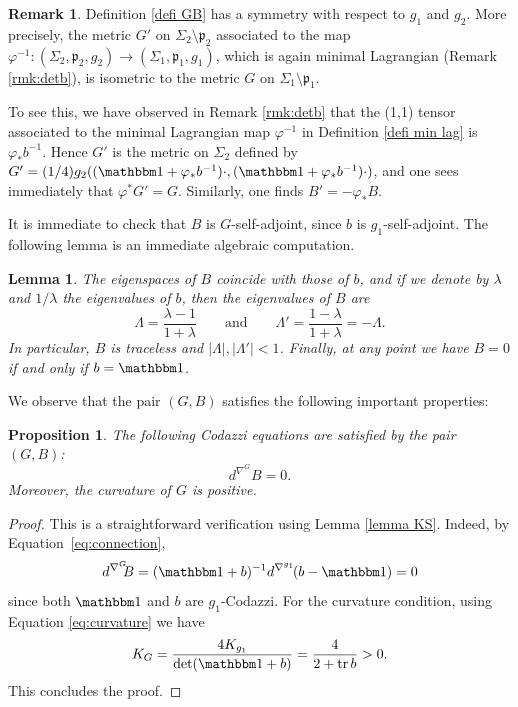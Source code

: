 \documentclass[JEP,XML,SOM,Unicode,NoEqCountersInSection,published]{cedram}
\newtheorem{prop}[cor]{Proposition}
\newtheorem{lemma}[cor]{Lemma}
\theoremstyle{definition}
\newtheorem{remark}[cor]{Remark}
\DeclareMathOperator{\tr}{tr}
\begin{document}
\begin{remark}\label{rmk inverse 2}
Definition \ref{defi GB} has a symmetry with respect to $g_1$ and $g_2$. More precisely, the metric $G'$ on $\Sigma_2\setminus \mathfrak p_2$ associated to the map $\varphi^{-1}:(\Sigma_2,\mathfrak p_2,g_2)\to (\Sigma_1,\mathfrak p_1,g_1)$, which is again minimal Lagrangian (Remark \ref{rmk:detb}), is isometric to the metric $G$ on $\Sigma_1\setminus \mathfrak p_1$.

To see this, we have observed in Remark \ref{rmk:detb} that the (1,1) tensor associated to the minimal Lagrangian map $\varphi^{-1}$ in Definition \ref{defi min lag} is $\varphi_*b^{-1}$. Hence $G'$ is the metric on $\Sigma_2$ defined by $G'=(1/4)g_2((\mathbbm 1+\varphi_*b^{-1})\cdot,(\mathbbm 1+\varphi_*b^{-1})\cdot)$, and one sees immediately that $\varphi^*G'=G$. Similarly, one finds $B'=-\varphi_*B$.
\end{remark}

It is immediate to check that $B$ is $G$-self-adjoint, since $b$ is $g_1$-self-adjoint. The following lemma is an immediate algebraic computation.

\begin{lemma} \label{prop eigenvalues}
The eigenspaces of $B$ coincide with those of $b$, and if we denote by $\lambda$ and $1/\lambda$ the eigenvalues of $b$, then the eigenvalues of $B$ are
\[
\Lambda=\frac{\lambda-1}{1+\lambda}\qquad\text{and}\qquad \Lambda'=\frac{1-\lambda}{1+\lambda}=-\Lambda.
\]
In particular, $B$ is traceless and $|\Lambda|,|\Lambda'|<1$. Finally, at any point we have $B=0$ if and only if $b=\mathbbm 1$.
\end{lemma}

We observe that the pair $(G,B)$ satisfies the following important properties:

\begin{prop}\label{prop GCS3}
The following Codazzi equations are satisfied by the pair $(G,B)$:
\[
d^{\nabla^G}\!\!B=0.
\]
Moreover, the curvature of $G$ is positive.
\end{prop}
\begin{proof}
This is a straightforward verification using Lemma \ref{lemma KS}. Indeed, by Equation~\eqref{eq:connection},
\[
d^{\nabla^G}\!\!B=(\mathbbm 1+b)^{-1}d^{\nabla^{g_1}}\!(b-\mathbbm 1)=0
\]
since both $\mathbbm 1$ and $b$ are $g_1$-Codazzi. For the curvature condition, using Equation \eqref{eq:curvature} we have
\[
K_G=\frac{4K_{g_1}}{\det(\mathbbm 1+b)}=\frac{4}{2+\tr b}>0.
\]
This concludes the proof.
\end{proof}
\end{document}
